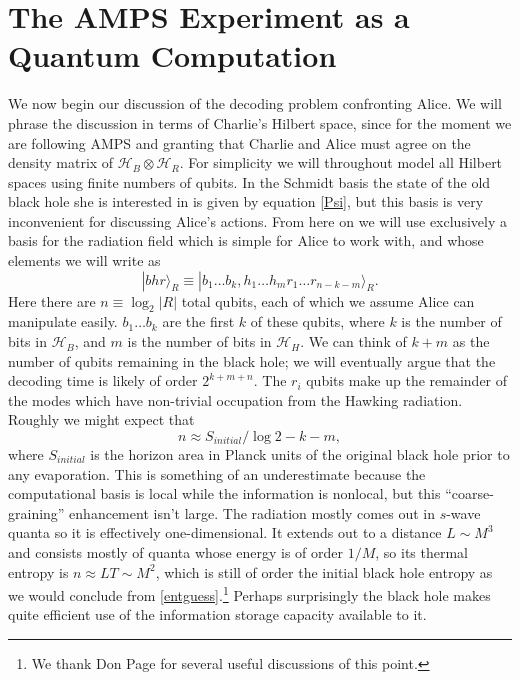 \documentclass[12pt]{article}
\newcommand{\be}{\begin{equation}}
\newcommand{\ee}{\end{equation}}
\newcommand{\HH}{\mathcal{H}_H}
\newcommand{\HB}{\mathcal{H}_B}
\newcommand{\HR}{\mathcal{H}_R}
\newcommand{\ran}{\rangle}
\begin{document}
\section{The AMPS Experiment as a Quantum Computation}\label{sec3}

We now begin our discussion of the decoding problem confronting Alice.  We will phrase the discussion in terms of Charlie's Hilbert space, since for the moment we are following AMPS and granting that Charlie and Alice must agree on the density matrix of $\HB\otimes \HR$.  For simplicity we will throughout model all Hilbert spaces using finite numbers of qubits.  In the Schmidt basis the state of the old black hole she is interested in is given by equation \eqref{Psi}, but this basis is very inconvenient for discussing Alice's actions.  From here on we will use exclusively a basis for the radiation field which is simple for Alice to work with, and whose elements we will write as
\be\label{Rbasis}
|bhr\ran_R\equiv |b_1\ldots b_k,h_1\ldots h_{m}r_1\ldots r_{n-k-m}\ran_R.
\ee
Here there are $n\equiv \log_2 |R|$ total qubits, each of which we assume Alice can manipulate easily.  $b_1\ldots b_k$ are the first $k$ of these qubits, where $k$ is the number of bits in $\HB$, and $m$ is the number of bits in $\HH$.  We can think of $k+m$ as the number of qubits remaining in the black hole; we will eventually argue that the decoding time is likely of order $2^{k+m+n}$.  The $r_i$ qubits make up the remainder of the modes which have non-trivial occupation from the Hawking radiation.  Roughly we might expect that
\be\label{entguess}
n\approx S_{initial}/\log 2-k-m,
\ee
where $S_{initial}$ is the horizon area in Planck units of the original black hole prior to any evaporation.  This is something of an underestimate because the computational basis is local while the information is nonlocal, but this ``coarse-graining'' enhancement isn't large.  The radiation mostly comes out in $s$-wave quanta so it is effectively one-dimensional.  It extends out to a distance $L\sim M^3$ and consists mostly of quanta whose energy is of order $1/M$, so its thermal entropy is $n\approx L T\sim M^2$, which is still of order the initial black hole entropy as we would conclude from \eqref{entguess}.\footnote{We thank Don Page for several useful discussions of this point.}  Perhaps surprisingly the black hole makes quite efficient use of the information storage capacity available to it.  
\end{document}
